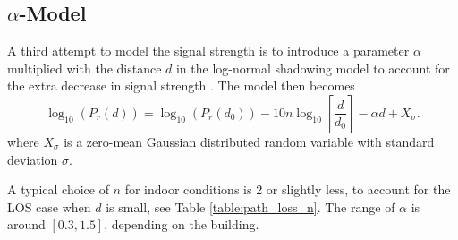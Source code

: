 \documentclass{LTHthesis}
\begin{document}
\subsection{$\alpha$-Model} %
%
A third attempt to model the signal strength is to introduce a parameter $\alpha$ multiplied with the distance $d$ in the log-normal shadowing model to account for the extra decrease in signal strength \cite{karlsson92}. The model then becomes
%
\begin{equation}
\log_{10}({P_r(d)})=\log_{10}({P_r(d_0)})-10n\log_{10}\left[{\frac{d}{d_0}}\right] - \alpha d+ X_\sigma.
\end{equation}
%
where $X_\sigma$ is a zero-mean Gaussian distributed random variable with standard deviation $\sigma$.

A typical choice of $n$ for indoor conditions is 2 or slightly less, to account for the LOS case when $d$ is small, see Table \ref{table:path_loss_n}. The range of $\alpha$ is around $[0.3,1.5]$, depending on the building.
\end{document}
